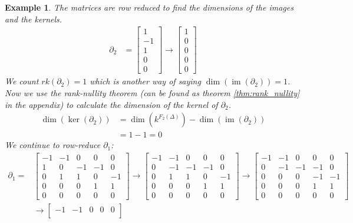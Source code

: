 \documentclass[11pt,a4paper,twoside]{report}
\newtheorem{myex}[mythm]{Example}
\DeclareMathOperator{\im}{im}
\begin{document}
\begin{myex}
The matrices are row reduced to find the dimensions of the images and the kernels.
\begin{align*}
\partial_2&= 
\begin{bmatrix}
1\\
-1\\
1\\
0\\
0
\end{bmatrix}
\to
\begin{bmatrix}
1\\
0\\
0\\
0\\
0
\end{bmatrix}
\end{align*}
We count $rk(\partial_2)=1$ which is another way of saying $\dim(\im(\partial_2))=1$. Now we use the rank-nullity theorem (can be found as theorem \ref{thm:rank_nullity} in the appendix) to calculate the dimension of the kernel of $\partial_2$.
\begin{align*}
\dim(\ker(\partial_2))&=\dim(k^{F_2(\Delta)})-\dim(\im(\partial_2))\\
&=1-1= 0
\end{align*}
We continue to row-reduce $\partial_1$:
\begin{align*}
\partial_1=&
\begin{bmatrix}
-1 & -1 & 0 & 0 & 0\\
1 & 0 & -1 & -1 & 0\\
0 & 1 & 1 & 0 & -1\\
0 & 0 & 0 & 1 & 1\\
0 & 0 & 0 & 0 & 0
\end{bmatrix}
\to
\begin{bmatrix}
-1 & -1 & 0 & 0 & 0\\
0 & -1 & -1 & -1 & 0\\
0 & 1 & 1 & 0 & -1\\
0 & 0 & 0 & 1 & 1\\
0 & 0 & 0 & 0 & 0
\end{bmatrix}
\to
\begin{bmatrix}
-1 & -1 & 0 & 0 & 0\\
0 & -1 & -1 & -1 & 0\\
0 & 0 & 0 & -1 & -1\\
0 & 0 & 0 & 1 & 1\\
0 & 0 & 0 & 0 & 0
\end{bmatrix}\\
&\to
\begin{bmatrix}
-1 & -1 & 0 & 0 & 0\\

\end{bmatrix}
\end{align*}
\end{myex}
\end{document}
